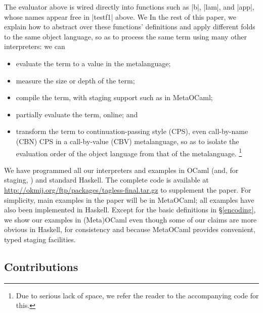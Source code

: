 The evaluator above is wired directly into
functions such as |b|, |lam|, and |app|, whose names appear
free in |testf1| above.
\ifshort We \else In the rest of this paper, we \fi
explain how to abstract over these functions' definitions
and apply different folds to the same object language, so as
to process the same term using many other
interpreters: we can
\begin{itemize}
    \item evaluate the term to a value in the metalanguage;
    \item measure the size or depth of the term;
    \item compile the term, with staging support such as in MetaOCaml;
    \item partially evaluate the term, online; and
    \item transform the term to continuation\hyp passing style (CPS),
        even call-by-name (CBN) CPS in a call-by-value (CBV) metalanguage,
        so as to isolate the evaluation
        order of the object language from that of the metalanguage.\ifshort
\footnote{Due to serious lack of space, 
we refer the reader to the accompanying code for this.}\fi
\end{itemize}
We have programmed all our interpreters and examples in OCaml (and, for staging,
\citet{metaocaml}) and standard Haskell. The complete code is
available at \url{http://okmij.org/ftp/packages/tagless-final.tar.gz}
to supplement the paper. 
\ifshort For simplicity, main examples in the paper will be in MetaOCaml;
all examples have also been implemented in Haskell.
\else Except for the basic definitions in \S\ref{encoding},
we show our examples in (Meta)OCaml even though some of our
claims are more obvious in Haskell, for consistency and because
MetaOCaml provides convenient, typed staging facilities.
\fi

\subsection{Contributions}\label{contributions}

